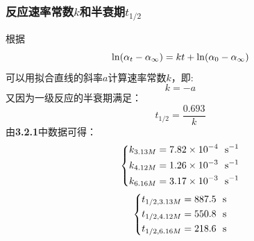 \documentclass[12pt]{article}
\begin{document}
					\subsubsection{反应速率常数$k$和半衰期$t_{1/2}$}
					根据
					$$
					{\rm ln}(\alpha_{t}-\alpha_{\infty})=kt+{\rm ln}(\alpha_{0}-\alpha_{\infty})
					$$
					可以用拟合直线的斜率$a$计算速率常数$k$，即:
					$$
					k=-a
					$$
					又因为一级反应的半衰期满足：
					$$
					t_{1/2}=\frac{0.693}{k}
					$$
					由\textbf{3.2.1}中数据可得：
					$$\left\{\begin{aligned}
					k_{3.13M}&=7.82\times10^{-4}\ \ {\rm s^{-1}}\\
					k_{4.12M}&=1.26\times10^{-3}\ \ {\rm s^{-1}}\\
					k_{6.16M}&=3.17\times10^{-3}\ \ {\rm s^{-1}}
					\end{aligned}\right.$$
					$$\left\{\begin{aligned}
					t_{1/2,3.13M}&=887.5\ \ {\rm s}\\
					t_{1/2,4.12M}&=550.8\ \ {\rm s}\\
					t_{1/2,6.16M}&=218.6\ \ {\rm s}
						\end{aligned}\right.$$
					\par
\end{document}

